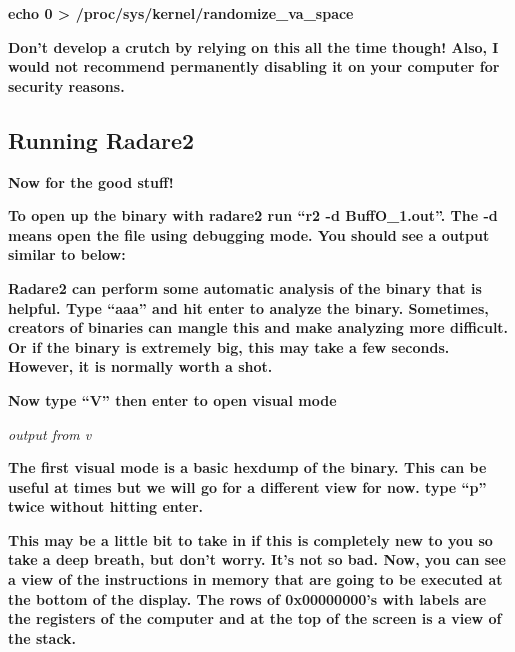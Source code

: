 \textbf{echo 0 {\textgreater} /proc/sys/kernel/randomize\_va\_space}

\textbf{Don't develop a crutch by relying on this all the time though! Also, I would not recommend permanently disabling
it on your computer for security reasons.}

\subsection{Running Radare2}

\textbf{Now for the good stuff!}

\textbf{To open up the binary with radare2 run ``r2 -d BuffO\_1.out''. The -d means open the file using debugging mode.
You should see a output similar to below:}

  
 

\textbf{Radare2 can perform some automatic analysis of the binary that is helpful. Type ``aaa'' and hit enter to analyze
the binary. Sometimes, creators of binaries can mangle this and make analyzing more difficult. Or if the binary is
extremely big, this may take a few seconds. However, it is normally worth a shot.}

  
 

\textbf{Now type ``V'' then enter to open visual mode}

  
 

\textit{output from v}

\textbf{The first visual mode is a basic hexdump of the binary. This can be useful at times but we will go for a
different view for now. type ``p'' twice without hitting enter.}

  
 

\textbf{This may be a little bit to take in if this is completely new to you so take a deep breath, but don't worry.
It's not so bad. Now, you can see a view of the instructions in memory that are going to be executed at the bottom of
the display. The rows of 0x00000000's with labels are the registers of the computer and at the top of the screen is a
view of the stack.}

  
 

